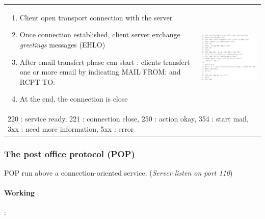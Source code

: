 \begin{tabular}{m{9cm}m{6cm}}
\begin{enumerate}
    \item Client open transport connection with the server
    \item Once connection established, client server exchange \textit{greetings}
        messages (\textsc{EHLO}) 
    \item After email transfert phase can start : clients transfert one or more email 
        by indicating \textsc{MAIL FROM:} and \textsc{RCPT TO:}
    \item At the end, the connection is close
\end{enumerate}
&
\includegraphics[width=7cm]{stmp.png} \\
\multicolumn{2}{m{15cm}}{220 : service ready, 221 : connection close, 250 : action okay, 354 : start mail, 3xx : need more information, 5xx : error}
\end{tabular}

\subsubsection{The post office protocol (POP) }
POP run above a connection-oriented service. (\textit{Server listen on port 110})

\paragraph{Working} :

